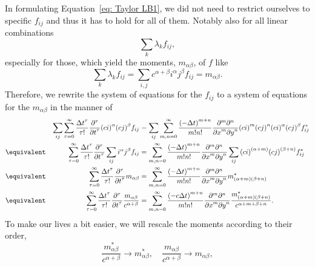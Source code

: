 In formulating Equation~\eqref{eq: Taylor LB1}, we did not need to restrict ourselves to specific $f_{ij}$ and thus it has to hold for all of them. Notably also for all linear combinations
\begin{equation*}
  \sum_{k}\lambda_k f_{ij},
\end{equation*}
especially for those, which yield the moments, $m_{\alpha\beta} $, of $f$ like
\begin{equation}
  \sum_{k}\lambda_k f_{ij} = \sum_{i,j}c^{\alpha + \beta}i^\alpha j^\beta f_{ij}=m_{\alpha\beta}.
\end{equation}
Therefore, we rewrite the system of equations for the $f_{ij}$ to a system of equations for the $m_{\alpha\beta}$ in the manner of
\begin{align}
    \nonumber
    & & \sum_{ij} \sum_{\tau = 0}^\infty \frac{{\Delta t}^\tau }{\tau!} \frac{\partial^\tau}{{\partial t}^\tau} {(ci)}^\alpha {(cj)}^\beta f_{ij}
    &=
    \sum_{ij}\sum_{m,n = 0}^\infty \frac{{(-\Delta t)}^{m+n}} {m!n!} \frac{\partial^m \partial^n}{ {\partial x}^m{\partial y}^n} {(ci)}^m {(cj)}^n {(ci)}^\alpha {(cj)}^\beta f^*_{ij}
    \\ \nonumber &\equivalent &
    \sum_{\tau = 0}^\infty \frac{{\Delta t}^\tau }{\tau!} \frac{\partial^\tau}{{\partial t}^\tau} \sum_{ij}i^\alpha j^\beta f_{ij}
    &=
    \sum_{m,n = 0}^\infty \frac{{(-\Delta t)}^{m+n}} {m!n!} \frac{\partial^m \partial^n}{ {\partial x}^m{\partial y}^n}\sum_{ij}{(ci)}^{(\alpha+m)} {(cj)}^{(\beta+n)} f^*_{ij}
    \\ \nonumber &\equivalent &
     \sum_{\tau = 0}^\infty \frac{{\Delta t}^\tau }{\tau!} \frac{\partial^\tau}{{\partial t}^\tau} m_{\alpha\beta} &=
    \sum_{m,n = 0}^\infty \frac{{(-\Delta t)}^{m+n}} {m!n!} \frac{\partial^m \partial^n}{ {\partial x}^m{\partial y}^n} m^*_{(\alpha + m)(\beta + n)}
     \\  \label{eq: Taylor of moments} &\equivalent &
     \sum_{\tau = 0}^\infty \frac{{\Delta t}^\tau }{\tau!} \frac{\partial^\tau}{{\partial t}^\tau} \frac{m_{\alpha\beta}}{c^{\alpha + \beta}} &=
    \sum_{m,n = 0}^\infty \frac{{(- c\Delta t)}^{m+n}} {m!n!} \frac{\partial^m \partial^n}{ {\partial x}^m{\partial y}^n} \frac{m^*_{(\alpha + m)(\beta + n)}}{c^{\alpha + m + \beta + n}}.
\end{align}
To make our lives a bit easier, we will rescale the moments according to their order,
\begin{equation}
  \label{eq: rescaling the moments}
  \frac{m^*_{\alpha\beta}}{c^{\alpha + \beta}} \rightarrow m^*_{\alpha\beta}, \quad   \frac{m_{\alpha\beta}}{c^{\alpha + \beta}} \rightarrow m_{\alpha\beta},
\end{equation}
